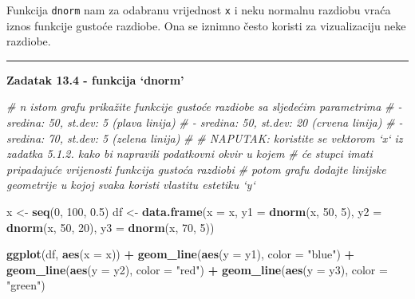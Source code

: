 \documentclass[]{book}
\newenvironment{Shaded}{\begin{snugshade}}{\end{snugshade}}
\newcommand{\KeywordTok}[1]{\textcolor[rgb]{0.13,0.29,0.53}{\textbf{#1}}}
\newcommand{\DataTypeTok}[1]{\textcolor[rgb]{0.13,0.29,0.53}{#1}}
\newcommand{\DecValTok}[1]{\textcolor[rgb]{0.00,0.00,0.81}{#1}}
\newcommand{\FloatTok}[1]{\textcolor[rgb]{0.00,0.00,0.81}{#1}}
\newcommand{\StringTok}[1]{\textcolor[rgb]{0.31,0.60,0.02}{#1}}
\newcommand{\CommentTok}[1]{\textcolor[rgb]{0.56,0.35,0.01}{\textit{#1}}}
\newcommand{\OperatorTok}[1]{\textcolor[rgb]{0.81,0.36,0.00}{\textbf{#1}}}
\newcommand{\NormalTok}[1]{#1}
\theoremstyle{definition}
\theoremstyle{definition}
\theoremstyle{definition}
\theoremstyle{remark}
\begin{document}
Funkcija \texttt{dnorm} nam za odabranu vrijednost \texttt{x} i neku
normalnu razdiobu vraća iznos funkcije gustoće razdiobe. Ona se iznimno
često koristi za vizualizaciju neke razdiobe.

\begin{center}\rule{0.5\linewidth}{\linethickness}\end{center}

\textbf{Zadatak 13.4 - funkcija `dnorm'}

\begin{Shaded}
\begin{Highlighting}[]
\CommentTok{# n istom grafu prikažite funkcije gustoće razdiobe sa sljedećim parametrima}
\CommentTok{#   - sredina: 50, st.dev: 5   (plava linija)}
\CommentTok{#   - sredina: 50, st.dev: 20  (crvena linija)}
\CommentTok{#   - sredina: 70, st.dev: 5   (zelena linija)}
\CommentTok{#}
\CommentTok{# NAPUTAK: koristite se vektorom `x` iz zadatka 5.1.2. kako bi napravili podatkovni okvir u kojem}
\CommentTok{#          će stupci imati pripadajuće vrijenosti funkcija gustoća razdiobi}
\CommentTok{#          potom grafu dodajte linijske geometrije u kojoj svaka koristi vlastitu estetiku `y`}
\end{Highlighting}
\end{Shaded}

\begin{Shaded}
\begin{Highlighting}[]
\NormalTok{x <-}\StringTok{ }\KeywordTok{seq}\NormalTok{(}\DecValTok{0}\NormalTok{, }\DecValTok{100}\NormalTok{, }\FloatTok{0.5}\NormalTok{)}
\NormalTok{df <-}\StringTok{ }\KeywordTok{data.frame}\NormalTok{(}\DataTypeTok{x =}\NormalTok{ x, }\DataTypeTok{y1 =} \KeywordTok{dnorm}\NormalTok{(x, }\DecValTok{50}\NormalTok{, }\DecValTok{5}\NormalTok{), }\DataTypeTok{y2 =} \KeywordTok{dnorm}\NormalTok{(x, }\DecValTok{50}\NormalTok{, }\DecValTok{20}\NormalTok{), }\DataTypeTok{y3 =} \KeywordTok{dnorm}\NormalTok{(x, }\DecValTok{70}\NormalTok{, }\DecValTok{5}\NormalTok{))}

\KeywordTok{ggplot}\NormalTok{(df, }\KeywordTok{aes}\NormalTok{(}\DataTypeTok{x =}\NormalTok{ x)) }\OperatorTok{+}\StringTok{ }\KeywordTok{geom_line}\NormalTok{(}\KeywordTok{aes}\NormalTok{(}\DataTypeTok{y =}\NormalTok{ y1), }\DataTypeTok{color =} \StringTok{"blue"}\NormalTok{) }\OperatorTok{+}
\StringTok{        }\KeywordTok{geom_line}\NormalTok{(}\KeywordTok{aes}\NormalTok{(}\DataTypeTok{y =}\NormalTok{ y2), }\DataTypeTok{color =} \StringTok{"red"}\NormalTok{) }\OperatorTok{+}\StringTok{ }\KeywordTok{geom_line}\NormalTok{(}\KeywordTok{aes}\NormalTok{(}\DataTypeTok{y =}\NormalTok{ y3), }\DataTypeTok{color =} \StringTok{"green"}\NormalTok{) }
\end{Highlighting}
\end{Shaded}
\end{document}

